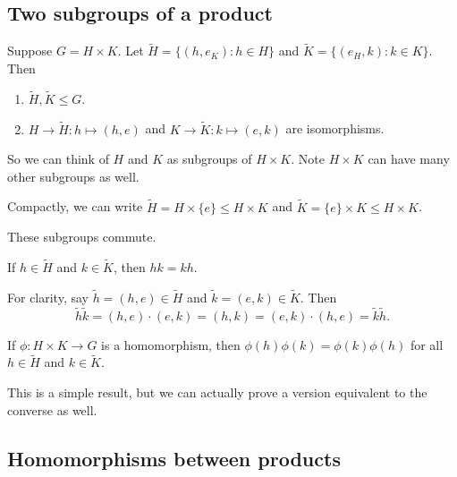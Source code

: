 \documentclass[12pt,letterpaper]{report}
\begin{document}
\pagebreak
\subsection{Two subgroups of a product}

\begin{prop}{}{}
  Suppose $G = H \times K$.
  Let $\tilde{H} = \{(h, e_K) : h \in H\}$ and $\tilde{K} = \{(e_H, k): k \in K\}$.
  Then
  \begin{enumerate}
    \item $\tilde{H}, \tilde{K} \leq G$.
    \item $H \to \tilde{H} : h \mapsto (h, e)$ and $K \to \tilde{K} : k \mapsto (e, k)$ are
    isomorphisms.
  \end{enumerate}
\end{prop}

\begin{thmproof}
\end{thmproof}

So we can think of $H$ and $K$ as subgroups of $H \times K$.
Note $H \times K$ can have many other subgroups as well.

Compactly, we can write $\tilde{H} = H \times \{e\} \leq H \times K$ and
$\tilde{K} = \{e\} \times K \leq H \times K$.

These subgroups commute.
\begin{lem}{}{}
  If $h \in \tilde{H}$ and $k \in \tilde{K}$, then $hk = kh$.
\end{lem}

\begin{thmproof}
  For clarity, say $\tilde{h} = (h, e) \in \tilde{H}$ and $\tilde{k} = (e, k) \in \tilde{K}$.
  Then
  \[
    \tilde{h}\tilde{k} = (h, e) \cdot (e, k) = (h, k) = (e, k) \cdot (h, e) = \tilde{k}\tilde{h}.
  \]
\end{thmproof}

\begin{cor}{}{}
  If $\phi \colon H \times K \to G$ is a homomorphism, then $\phi(h)\phi(k) = \phi(k)\phi(h)$ for
  all $h \in \tilde{H}$ and $k \in \tilde{K}$.
\end{cor}

This is a simple result, but we can actually prove a version equivalent to the converse as well.

\pagebreak
\subsection{Homomorphisms between products}
\end{document}
